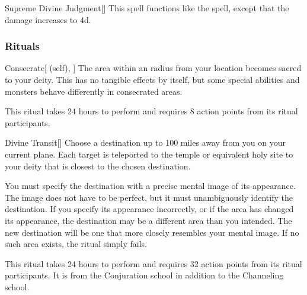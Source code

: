 \lowercase{\hypertarget{spell:Supreme Divine Judgment}{}}\label{spell:Supreme Divine Judgment}
\begin{freeability}[\nth{7}]{\hypertarget{spell:Supreme Divine Judgment}{Supreme Divine Judgment}}[]
This spell functions like the  spell, except that the damage increases to  \plus4d.
\end{freeability}
\vspace{0.25em}



\subsubsection{Rituals}


\lowercase{\hypertarget{spell:Consecrate}{}}\label{spell:Consecrate}
\begin{attuneability}[\nth{2}]{\hypertarget{spell:Consecrate}{Consecrate}}[ (self), ]
\targetrule
The area within an \arealarge radius  from your location becomes sacred to your deity.
This has no tangible effects by itself, but some special abilities and monsters behave differently in consecrated areas.

This ritual takes 24 hours to perform and requires 8 action points from its ritual participants.
\end{attuneability}
\vspace{0.25em}



\lowercase{\hypertarget{spell:Divine Transit}{}}\label{spell:Divine Transit}
\begin{apability}[\nth{4}]{\hypertarget{spell:Divine Transit}{Divine Transit}}[]
Choose a destination up to 100 miles away from you on your current plane.
Each target is teleported to the temple or equivalent holy site to your deity that is closest to the chosen destination.

You must specify the destination with a precise mental image of its appearance.
The image does not have to be perfect, but it must unambiguously identify the destination.
If you specify its appearance incorrectly, or if the area has changed its appearance, the destination may be a different area than you intended.
The new destination will be one that more closely resembles your mental image.
If no such area exists, the ritual simply fails.

This ritual takes 24 hours to perform and requires 32 action points from its ritual participants.
It is from the Conjuration school in addition to the Channeling school.
\end{apability}
\vspace{0.25em}


